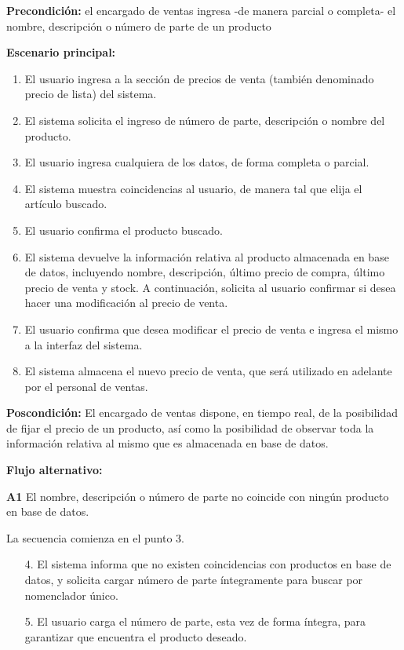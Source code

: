 \textbf{Precondición:} 
el encargado de ventas ingresa -de manera parcial o completa- el nombre, descripción o número de parte de un producto

\textbf{Escenario principal:}
\begin{enumerate}
	\item El usuario ingresa a la sección de precios de venta (también denominado precio de lista) del sistema.
	\item El sistema solicita el ingreso de número de parte, descripción o nombre del producto.
	\item El usuario ingresa cualquiera de los datos, de forma completa o parcial.
	\item El sistema muestra coincidencias al usuario, de manera tal que elija el artículo buscado.
	\item El usuario confirma el producto buscado.
	\item El sistema devuelve la información relativa al producto almacenada en base de datos,
	incluyendo nombre, descripción, último precio de compra, último precio de venta y stock.
	A continuación, solicita al usuario confirmar si desea hacer una modificación al precio de venta.
	\item El usuario confirma que desea modificar el precio de venta e ingresa el mismo a la interfaz del sistema.
	\item El sistema almacena el nuevo precio de venta, que será utilizado en adelante por el personal de ventas.
\end{enumerate}

\textbf{Poscondición:}
El encargado de ventas dispone, en tiempo real,
de la posibilidad de fijar el precio de un producto,
así como la posibilidad de observar toda la información relativa al mismo que es almacenada en base de datos.

\textbf{Flujo alternativo:}

\textbf{A1} El nombre, descripción o número de parte no coincide con ningún producto en base de datos.

La secuencia comienza en el punto 3.

\begin{enumerate}
	\item[4.] El sistema informa que no existen coincidencias con productos en base de datos,
	y solicita cargar número de parte íntegramente para buscar por nomenclador único.
	\item[5.] El usuario carga el número de parte, esta vez de forma íntegra,
	para garantizar que encuentra el producto deseado.
\end{enumerate}

